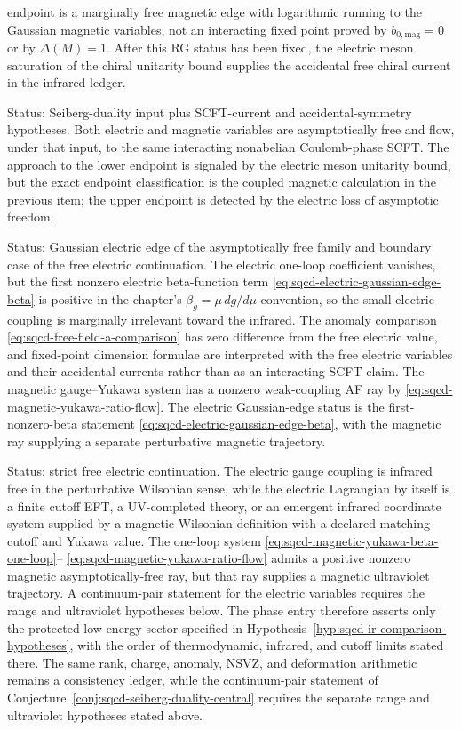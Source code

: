 \begin{description}
endpoint is a marginally free magnetic edge with logarithmic running to the
Gaussian magnetic variables, not an interacting fixed point proved by
\(b_{0,\mathrm{mag}}=0\) or by \(\Delta(M)=1\).  After this RG status has been
fixed, the electric meson saturation of the chiral unitarity bound supplies
the accidental free chiral current in the infrared ledger.
\item[\(\frac32N_c<N_f<3N_c\).]
Status: Seiberg-duality input plus SCFT-current and accidental-symmetry
hypotheses.  Both electric and magnetic variables are asymptotically free and
flow, under that input, to the same interacting nonabelian Coulomb-phase SCFT.
The approach to the lower endpoint is signaled by the electric meson
unitarity bound, but the exact endpoint classification is the coupled
magnetic calculation in the previous item; the upper endpoint is detected by
the electric loss of asymptotic freedom.
\item[\(N_f=3N_c\).]
Status: Gaussian electric edge of the asymptotically free family and boundary
case of the free electric continuation.  The electric one-loop coefficient
vanishes, but the first nonzero electric beta-function term
\eqref{eq:sqcd-electric-gaussian-edge-beta} is positive in the chapter's
\(\beta_g=\mu\,dg/d\mu\) convention, so the small electric coupling is
marginally irrelevant toward the infrared.  The anomaly comparison
\eqref{eq:sqcd-free-field-a-comparison} has zero difference from the free
electric value, and fixed-point dimension formulae are interpreted with the
free electric variables and their accidental currents rather than as an
interacting SCFT claim.  The magnetic gauge--Yukawa system has a nonzero
weak-coupling AF ray by
\eqref{eq:sqcd-magnetic-yukawa-ratio-flow}.  The electric Gaussian-edge
status is the first-nonzero-beta statement
\eqref{eq:sqcd-electric-gaussian-edge-beta}, with the magnetic ray supplying a
separate perturbative magnetic trajectory.
\item[\(N_f>3N_c\).]
Status: strict free electric continuation.  The electric gauge coupling is
infrared free in the perturbative Wilsonian sense, while the electric
Lagrangian by itself is a finite cutoff EFT, a UV-completed theory, or an
emergent infrared coordinate system supplied by a magnetic Wilsonian definition
with a declared matching cutoff and Yukawa value.  The one-loop system
\eqref{eq:sqcd-magnetic-yukawa-beta-one-loop}--
\eqref{eq:sqcd-magnetic-yukawa-ratio-flow} admits a positive nonzero magnetic
asymptotically-free ray, but that ray supplies a magnetic ultraviolet
trajectory.  A continuum-pair statement for the electric variables requires
the range and ultraviolet hypotheses below.  The phase entry therefore
asserts only the protected low-energy sector specified in
Hypothesis~\ref{hyp:sqcd-ir-comparison-hypotheses}, with the order of
thermodynamic, infrared, and cutoff limits stated there.  The same rank,
charge, anomaly, NSVZ, and deformation arithmetic remains a consistency
ledger, while the continuum-pair statement of
Conjecture~\ref{conj:sqcd-seiberg-duality-central} requires the separate
range and ultraviolet hypotheses stated above.
\end{description}

